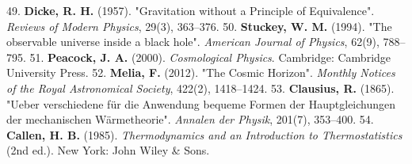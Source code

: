 \documentclass[11pt,a4paper]{article}
\theoremstyle{definition}\newtheorem{definition}{Definition}
\theoremstyle{remark}\newtheorem{remark}{Remark}
\begin{document}
49. \textbf{Dicke, R. H.} (1957). "Gravitation without a Principle of Equivalence". \textit{Reviews of Modern Physics}, 29(3), 363–376.
50. \textbf{Stuckey, W. M.} (1994). "The observable universe inside a black hole". \textit{American Journal of Physics}, 62(9), 788–795.
51. \textbf{Peacock, J. A.} (2000). \textit{Cosmological Physics}. Cambridge: Cambridge University Press.
52. \textbf{Melia, F.} (2012). "The Cosmic Horizon". \textit{Monthly Notices of the Royal Astronomical Society}, 422(2), 1418–1424.
53. \textbf{Clausius, R.} (1865). "Ueber verschiedene für die Anwendung bequeme Formen der Hauptgleichungen der mechanischen Wärmetheorie". \textit{Annalen der Physik}, 201(7), 353–400.
54. \textbf{Callen, H. B.} (1985). \textit{Thermodynamics and an Introduction to Thermostatistics} (2nd ed.). New York: John Wiley \& Sons.
\end{document}
